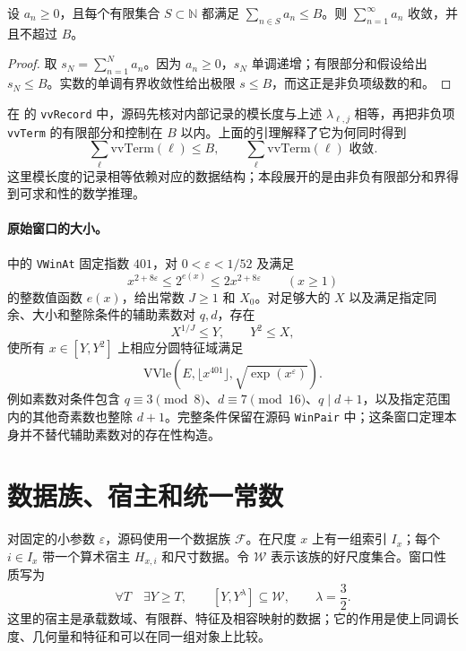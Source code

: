 \begin{lemma}[有限部分和怎样变成受控的无穷和]
设 $a_n\ge0$，且每个有限集合 $S\subset\mathbb N$ 都满足 $\sum_{n\in S}a_n\le B$。则 $\sum_{n=1}^{\infty}a_n$ 收敛，并且不超过 $B$。
\end{lemma}
\begin{proof}
取 $s_N=\sum_{n=1}^N a_n$。因为 $a_n\ge0$，$s_N$ 单调递增；有限部分和假设给出 $s_N\le B$。实数的单调有界收敛性给出极限 $s\le B$，而这正是非负项级数的和。
\end{proof}

在  的 \texttt{vvRecord} 中，源码先核对内部记录的模长度与上述 $\lambda_{\ell,j}$ 相等，再把非负项 \texttt{vvTerm} 的有限部分和控制在 $B$ 以内。上面的引理解释了它为何同时得到
\[
\sum_{\ell}\mathrm{vvTerm}(\ell)\le B,
\qquad \sum_{\ell}\mathrm{vvTerm}(\ell)\text{ 收敛}.
\]
这里模长度的记录相等依赖对应的数据结构；本段展开的是由非负有限部分和界得到可求和性的数学推理。

\paragraph{原始窗口的大小。}
 中的 \texttt{VWinAt} 固定指数 $401$，对
$0<\varepsilon<1/52$ 及满足
\[
x^{2+8\varepsilon}\le2^{e(x)}\le2x^{2+8\varepsilon}\qquad(x\ge1)
\]
的整数值函数 $e(x)$，给出常数 $J\ge1$ 和 $X_0$。对足够大的 $X$ 以及满足指定同余、大小和整除条件的辅助素数对 $q,d$，存在
\[
X^{1/J}\le Y,\qquad Y^2\le X,
\]
使所有 $x\in[Y,Y^2]$ 上相应分圆特征域满足
\begin{equation}
\mathrm{VVle}\left(E,\lfloor x^{401}\rfloor,
\sqrt{\exp(x^\varepsilon)}\right).
\label{eq:arith-vwin}
\end{equation}
例如素数对条件包含 $q\equiv3\pmod8$、$d\equiv7\pmod{16}$、$q\mid d+1$，以及指定范围内的其他奇素数也整除 $d+1$。完整条件保留在源码 \texttt{WinPair} 中；这条窗口定理本身并不替代辅助素数对的存在性构造。


\section{数据族、宿主和统一常数}
\label{sec:arith-family}
对固定的小参数 $\varepsilon$，源码使用一个数据族 $\mathcal F$。在尺度 $x$ 上有一组索引 $I_x$；每个 $i\in I_x$ 带一个算术宿主 $H_{x,i}$ 和尺寸数据。令 $\mathcal W$ 表示该族的好尺度集合。窗口性质写为
\begin{equation}
\forall T\quad\exists Y\ge T,
\qquad [Y,Y^\lambda]\subseteq\mathcal W,
\qquad\lambda=\frac32.
\label{eq:arith-family-windows}
\end{equation}
这里的宿主是承载数域、有限群、特征及相容映射的数据；它的作用是使上同调长度、几何量和特征和可以在同一组对象上比较。


